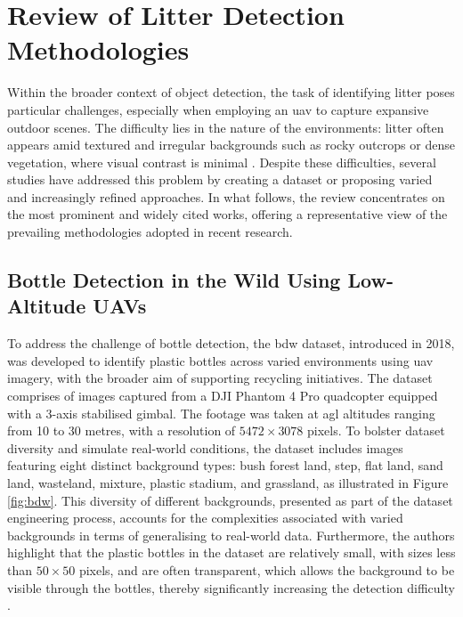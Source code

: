 
\section{Review of Litter Detection Methodologies}
\label{sec:3_litter}

Within the broader context of object detection, the task of identifying litter poses particular challenges, especially when employing an \gls{uav} to capture expansive outdoor scenes. The difficulty lies in the nature of the environments: litter often appears amid textured and irregular backgrounds such as rocky outcrops or dense vegetation, where visual contrast is minimal \cite{small_litter_detection, taco2020, plastopol}. Despite these difficulties, several studies have addressed this problem by creating a dataset or proposing varied and increasingly refined approaches. In what follows, the review concentrates on the most prominent and widely cited works, offering a representative view of the prevailing methodologies adopted in recent research.

\subsection{Bottle Detection in the Wild Using Low-Altitude UAVs}
\label{subsec:3_bdw}

To address the challenge of bottle detection, the \gls{bdw} dataset, introduced in 2018, was developed to identify plastic bottles across varied environments using \gls{uav} imagery, with the broader aim of supporting recycling initiatives. The dataset comprises of images captured from a DJI Phantom 4 Pro quadcopter equipped with a 3-axis stabilised gimbal. The footage was taken at \gls{agl} altitudes ranging from 10 to 30 metres, with a resolution of $5472 \times 3078$ pixels. 
To bolster dataset diversity and simulate real-world conditions, the dataset includes images featuring eight distinct background types: bush forest land, step, flat land, sand land, wasteland, mixture, plastic stadium, and grassland, as illustrated in Figure \ref{fig:bdw}. This diversity of different backgrounds, presented as part of the dataset engineering process, accounts for the complexities associated with varied backgrounds in terms of generalising to real-world data. Furthermore, the authors highlight that the plastic bottles in the dataset are relatively small, with sizes less than $50 \times 50$ pixels, and are often transparent, which allows the background to be visible through the bottles, thereby significantly increasing the detection difficulty \cite{bdwdataset}.

